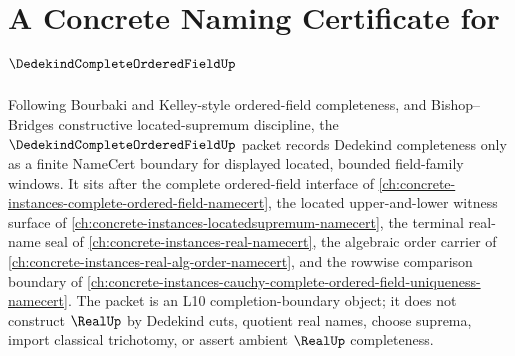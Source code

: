 \chapter{A Concrete Naming Certificate for $\DedekindCompleteOrderedFieldUp$}
\label{ch:concrete-instances-dedekind-complete-ordered-field-namecert}

Following Bourbaki and Kelley-style ordered-field completeness, and Bishop--Bridges constructive located-supremum discipline, the $\DedekindCompleteOrderedFieldUp$ packet records Dedekind completeness only as a finite NameCert boundary for displayed located, bounded field-family windows. It sits after the complete ordered-field interface of \autoref{ch:concrete-instances-complete-ordered-field-namecert}, the located upper-and-lower witness surface of \autoref{ch:concrete-instances-locatedsupremum-namecert}, the terminal real-name seal of \autoref{ch:concrete-instances-real-namecert}, the algebraic order carrier of \autoref{ch:concrete-instances-real-alg-order-namecert}, and the rowwise comparison boundary of \autoref{ch:concrete-instances-cauchy-complete-ordered-field-uniqueness-namecert}. The packet is an L10 completion-boundary object; it does not construct $\RealUp$ by Dedekind cuts, quotient real names, choose suprema, import classical trichotomy, or assert ambient $\RealUp$ completeness.

